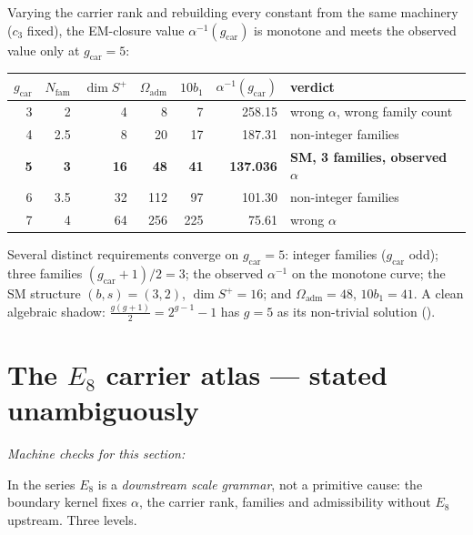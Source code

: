 \documentclass[11pt,a4paper]{article}
\newcommand{\gcar}{g_{\mathrm{car}}}
\newcommand{\Nfam}{N_{\mathrm{fam}}}
\newcommand{\Oadm}{\Omega_{\mathrm{adm}}}
\newcommand{\cthree}{c_3}
\theoremstyle{definition}
\begin{document}
Varying the carrier rank and rebuilding every constant from the same machinery ($\cthree$ fixed),
the EM-closure value $\alpha^{-1}(\gcar)$ is monotone and meets the observed value only at $\gcar=5$:
\begin{center}\small
\begin{tabular}{@{}r r r r r r l@{}}
\toprule
$\gcar$ & $\Nfam$ & $\dim S^+$ & $\Oadm$ & $10b_1$ & $\alpha^{-1}(\gcar)$ & verdict \\
\midrule
3 & 2 & 4 & 8 & 7 & 258.15 & wrong $\alpha$, wrong family count \\
4 & 2.5 & 8 & 20 & 17 & 187.31 & non-integer families \\
\textbf{5} & \textbf{3} & \textbf{16} & \textbf{48} & \textbf{41} & \textbf{137.036} & \textbf{SM, 3 families, observed $\alpha$} \\
6 & 3.5 & 32 & 112 & 97 & 101.30 & non-integer families \\
7 & 4 & 64 & 256 & 225 & 75.61 & wrong $\alpha$ \\
\bottomrule
\end{tabular}
\end{center}
Several distinct requirements converge on $\gcar=5$: integer families ($\gcar$ odd); three families
$(\gcar{+}1)/2=3$; the observed $\alpha^{-1}$ on the monotone curve; the SM structure $(b,s)=(3,2)$,
$\dim S^+=16$; and $\Oadm=48$, $10b_1=41$. A clean algebraic shadow:
$\tfrac{g(g+1)}{2}=2^{g-1}-1$ has $g=5$ as its non-trivial solution (\mC).

\section{The $E_8$ carrier atlas --- stated unambiguously}
\noindent\emph{Machine checks for this section:} 

\label{sec:e8}

In the series $E_8$ is a \emph{downstream scale grammar}, not a primitive cause: the boundary kernel
fixes $\alpha$, the carrier rank, families and admissibility without $E_8$ upstream. Three levels.
\end{document}
